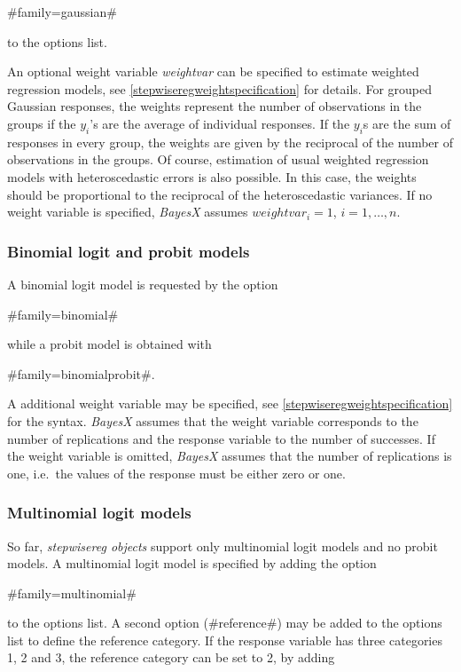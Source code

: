 #family=gaussian#

to the options list.

An optional weight variable {\em weightvar} can be specified to
estimate weighted regression models, see
\autoref{stepwiseregweightspecification} for details. For grouped Gaussian
responses, the weights represent the number of observations in the
groups if the $y_i$'s are the average of individual responses. If
the $y_i$s are the sum of responses in every group, the weights are
given by the reciprocal of the number of observations in the groups.
Of course, estimation of usual weighted regression models with
heteroscedastic errors is also possible. In this case, the weights
should be proportional to the reciprocal of the heteroscedastic
variances. If no weight variable is specified, {\em BayesX} assumes
$weightvar_i = 1$, $i=1,\dots,n$.

\subsubsection*{Binomial logit and probit models}

A binomial logit model is requested by the option

#family=binomial#

while a probit model is obtained with

#family=binomialprobit#.

A additional weight variable may be specified, see
\autoref{stepwiseregweightspecification} for the syntax. {\em BayesX} assumes
that the weight variable corresponds to the number of replications
and the response variable to the number of successes. If the weight
variable is omitted, {\em BayesX} assumes that the number of
replications is one, i.e.~the values of the response must be either
zero or one.

\subsubsection*{Multinomial logit models}

So far, {\em stepwisereg objects} support only multinomial logit models
and no probit models. A multinomial logit model is specified by adding
the option

#family=multinomial#

to the options list. A second
option (#reference#) may be added to the options list to define the
reference category.  If the response variable has three categories
1, 2 and 3, the reference category can be set to 2, by adding

